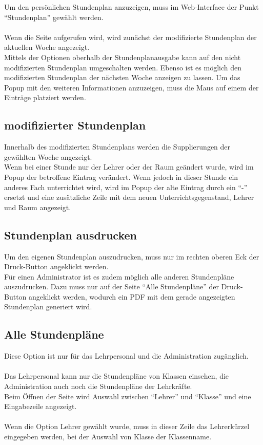 Um den persönlichen Stundenplan anzuzeigen, muss im Web-Interface der Punkt \enquote{Stundenplan} gewählt werden. \\
\\
Wenn die Seite aufgerufen wird, wird zunächst der modifizierte Stundenplan der aktuellen Woche angezeigt.\\
Mittels der Optionen oberhalb der Stundenplanausgabe kann auf den nicht modifizierten Stundenplan umgeschalten werden. Ebenso ist es möglich den modifizierten Stundenplan der nächsten Woche anzeigen zu lassen.
Um das Popup mit den weiteren Informationen anzuzeigen, muss die Maus auf einem der Einträge platziert werden.
\subsection{modifizierter Stundenplan}
Innerhalb des modifizierten Stundenplans werden die Supplierungen der gewählten Woche angezeigt.\\
Wenn bei einer Stunde nur der Lehrer oder der Raum geändert wurde, wird im Popup der betroffene Eintrag verändert. Wenn jedoch in dieser Stunde ein anderes Fach unterrichtet wird, wird im Popup der alte Eintrag durch ein \enquote{-} ersetzt und eine zusätzliche Zeile mit dem neuen Unterrichtsgegenstand, Lehrer und Raum angezeigt.
\subsection{Stundenplan ausdrucken}
Um den eigenen Stundenplan auszudrucken, muss nur im rechten oberen Eck der Druck-Button angeklickt werden.\\
Für einen Administrator ist es zudem möglich alle anderen Stundenpläne auszudrucken. Dazu muss nur auf der Seite \enquote{Alle Stundenpläne} der Druck-Button angeklickt werden, wodurch ein PDF mit dem gerade angezeigten Stundenplan generiert wird.
\subsection{Alle Stundenpläne}
Diese Option ist nur für das Lehrpersonal und die Administration zugänglich.\\\\
Das Lehrpersonal kann nur die Stundenpläne von Klassen einsehen, die Administration auch noch die Stundenpläne der Lehrkräfte.\\
Beim Öffnen der Seite wird Auswahl zwischen \enquote{Lehrer} und \enquote{Klasse} und eine Eingabezeile angezeigt.\\
\\
Wenn die Option Lehrer gewählt wurde, muss in dieser Zeile das Lehrerkürzel eingegeben werden, bei der Auswahl von Klasse der Klassenname.

